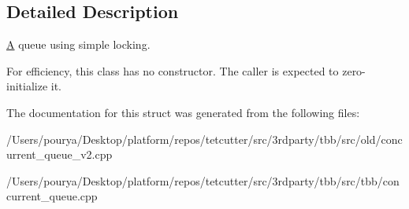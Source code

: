 \subsection{Detailed Description}
\hyperlink{structA}{A} queue using simple locking. 

For efficiency, this class has no constructor. The caller is expected to zero-\/initialize it. 

The documentation for this struct was generated from the following files\+:\begin{DoxyCompactItemize}
\item 
/\+Users/pourya/\+Desktop/platform/repos/tetcutter/src/3rdparty/tbb/src/old/concurrent\+\_\+queue\+\_\+v2.\+cpp\item 
/\+Users/pourya/\+Desktop/platform/repos/tetcutter/src/3rdparty/tbb/src/tbb/concurrent\+\_\+queue.\+cpp\end{DoxyCompactItemize}
